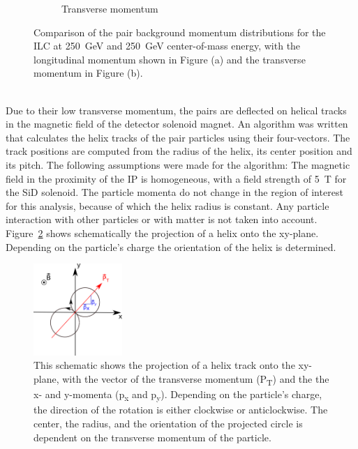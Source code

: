 \begin{figure}[h]
\begin{subfigure}[b]{0.49\textwidth}
   \caption{Transverse momentum}
   \end{subfigure}
   \caption[Pair background momentum distributions]{Comparison of the pair background momentum distributions for the ILC at \SI{250}{\GeV} and \SI{250}{\GeV} center-of-mass energy, with the longitudinal momentum shown in Figure (a) and the transverse momentum in Figure (b).}
   \label{fig:PairBkg:Momentum}
 \end{figure}
\\Due to their low transverse momentum, the pairs are deflected on helical tracks in the magnetic field of the detector solenoid magnet.
An algorithm was written that calculates the helix tracks of the pair particles using their four-vectors.
The track positions are computed from the radius of the helix, its center position and its pitch. The following assumptions were made for the algorithm:
The magnetic field in the proximity of the IP is homogeneous, with a field strength of \SI{5}{\tesla} for the SiD solenoid.
The particle momenta do not change in the region of interest for this analysis, because of which the helix radius is constant.
Any particle interaction with other particles or with matter is not taken into account.
\\Figure~\ref{fig:helix_circle} shows schematically the projection of a helix onto the xy-plane.
Depending on the particle's charge the orientation of the helix is determined.
\begin{figure}
    \centering
    \includegraphics[width=0.3\textwidth]{Figures/Pairs/Helix_explanation.png}
    \caption[Schematic projection of the helix on the xy-plane]{
    This schematic shows the projection of a helix track onto the xy-plane, with the vector of the transverse momentum (P\textsubscript{T}) and the the x- and y-momenta (p\textsubscript{x} and p\textsubscript{y}).
    Depending on the particle's charge, the direction of the rotation is either clockwise or anticlockwise.
    The center, the radius, and the orientation of the projected circle is dependent on the transverse momentum of the particle.
    }
    \label{fig:helix_circle}
\end{figure}
